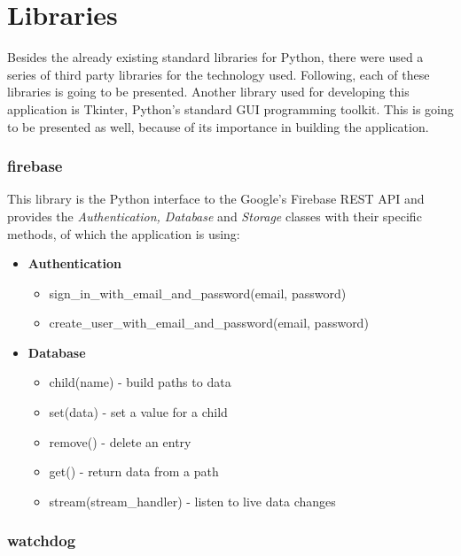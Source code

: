 \documentclass[12pt]{report}
\begin{document}
\section{Libraries}

Besides the already existing standard libraries for Python, there were used a series of third party libraries for the technology used. Following, each of these libraries is going to be presented. Another library used for developing this application is Tkinter, Python's standard GUI programming toolkit. This is going to be presented as well, because of its importance in building the application.

\subsubsection{firebase \cite{pyfirebase}}

This library is the Python interface to the Google's Firebase REST API and provides the \textit{Authentication, Database} and \textit{Storage} classes with their specific methods, of which the application is using:

\begin{itemize}

\item \textbf{Authentication}

\begin{itemize}
\item sign\_in\_with\_email\_and\_password(email, password)
\item create\_user\_with\_email\_and\_password(email, password)
\end{itemize}

\item \textbf{Database}

\begin{itemize}
\item child(name) - build paths to data
\item set(data) - set a value for a child
\item remove() -  delete an entry
\item get() - return data from a path
\item stream(stream\_handler) - listen to live data changes
\end{itemize}

\end{itemize}

\subsubsection{watchdog \cite{watchdog}}
\label{sec:watchdog}
\end{document}

